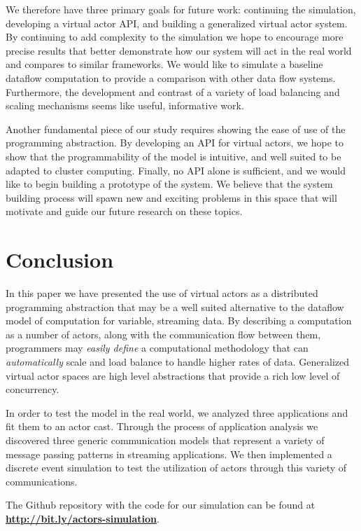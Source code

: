 \documentclass[conference,twocolumn,10pt]{IEEEtran}
\newcommand{\bennote}[1]{\textcolor{magenta}{\bf #1}}
\begin{document}
We therefore have three primary goals for future work: continuing the simulation, developing a virtual actor API, and building a generalized virtual actor system. By continuing to add complexity to the simulation we hope to encourage more precise results that better demonstrate how our system will act in the real world and compares to similar frameworks. We would like to simulate a baseline dataflow computation to provide a comparison with other data flow systems. Furthermore, the development and contrast of a variety of load balancing and scaling mechanisms seems like useful, informative work.

Another fundamental piece of our study requires showing the ease of use of the programming abstraction. By developing an API for virtual actors, we hope to show that the programmability of the model is intuitive, and well suited to be adapted to cluster computing. Finally, no API alone is sufficient, and we would like to begin building a prototype of the system. We believe that the system building process will spawn new and exciting problems in this space that will motivate and guide our future research on these topics.

\section{Conclusion}

In this paper we have presented the use of virtual actors as a distributed programming abstraction that may be a well suited alternative to the dataflow model of computation for variable, streaming data. By describing a computation as a number of actors, along with the communication flow between them, programmers may \textit{easily define} a computational methodology that can \textit{automatically} scale and load balance to handle higher rates of data. Generalized virtual actor spaces are high level abstractions that provide a rich low level of concurrency.

In order to test the model in the real world, we analyzed three applications and fit them to an actor cast. Through the process of application analysis we discovered three generic communication models that represent a variety of message passing patterns in streaming applications. We then implemented a discrete event simulation to test the utilization of actors through this variety of communications.


The Github repository with the code for our simulation can be found at \bennote{\url{http://bit.ly/actors-simulation}}.
\end{document}
